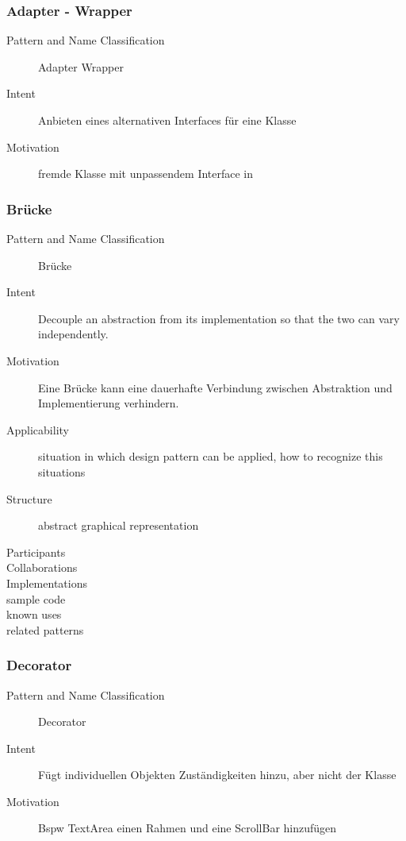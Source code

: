 \documentclass[a4paper, 10pt]{article}
\begin{document}
\subsubsection{Adapter - Wrapper}
\begin{description}
	\item[Pattern and Name Classification] Adapter Wrapper
	\item[Intent] Anbieten eines alternativen Interfaces für eine Klasse
	\item[Motivation] fremde Klasse mit unpassendem Interface in 
\end{description}

\subsubsection{Brücke}
\begin{description}
	\item[Pattern and Name Classification] Brücke
	\item[Intent] Decouple an abstraction from its implementation so that the two can vary independently.
	\item[Motivation] Eine Brücke kann eine dauerhafte Verbindung zwischen Abstraktion und Implementierung verhindern.
	\item[Applicability] situation in which design pattern can be applied, how to recognize this situations
	\item[Structure] abstract graphical representation
	\item[Participants]
	\item[Collaborations]
	\item[Implementations]
	\item[sample code]
	\item[known uses]
	\item[related patterns]
\end{description}

\subsubsection{Decorator}
\begin{description}
	\item[Pattern and Name Classification] Decorator
	\item[Intent] Fügt individuellen Objekten Zuständigkeiten hinzu, aber nicht der Klasse
	\item[Motivation] Bspw TextArea einen Rahmen und eine ScrollBar hinzufügen
\end{description}
\end{document}
